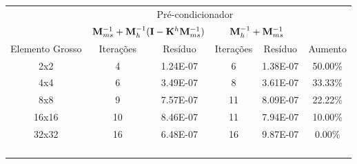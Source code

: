 \begin{table}[]
\begin{tabular}{cccccc}
\cline{2-5}
\multicolumn{1}{c|}{}                 & \multicolumn{4}{c|}{Pré-condicionador}                                                                                          &                              \\ \cline{2-5}
\multicolumn{1}{c|}{}                 & \multicolumn{2}{c|}{$\mathbf{M}^{-1}_{ms} +\mathbf{M}^{-1}_{h}(\mathbf{I}- \mathbf{K}^h \mathbf{M}^{-1}_{ms})$}                             & \multicolumn{2}{c|}{$\mathbf{M}^{-1}_{h} + \mathbf{M}^{-1}_{ms}$}                              &                              \\ \hline
\multicolumn{1}{|c|}{Elemento Grosso} & \multicolumn{1}{c|}{Iterações} & \multicolumn{1}{c|}{Resíduo}  & \multicolumn{1}{c|}{Iterações} & \multicolumn{1}{c|}{Resíduo}  & \multicolumn{1}{c|}{Aumento} \\ \hline
\multicolumn{1}{|c|}{2x2}             & \multicolumn{1}{c|}{4}         & \multicolumn{1}{c|}{1.24E-07} & \multicolumn{1}{c|}{6}         & \multicolumn{1}{c|}{1.38E-07} & \multicolumn{1}{c|}{50.00\%} \\ \hline
\multicolumn{1}{|c|}{4x4}             & \multicolumn{1}{c|}{6}         & \multicolumn{1}{c|}{3.49E-07} & \multicolumn{1}{c|}{8}         & \multicolumn{1}{c|}{3.61E-07} & \multicolumn{1}{c|}{33.33\%} \\ \hline
\multicolumn{1}{|c|}{8x8}             & \multicolumn{1}{c|}{9}         & \multicolumn{1}{c|}{7.57E-07} & \multicolumn{1}{c|}{11}        & \multicolumn{1}{c|}{8.09E-07} & \multicolumn{1}{c|}{22.22\%} \\ \hline
\multicolumn{1}{|c|}{16x16}           & \multicolumn{1}{c|}{10}        & \multicolumn{1}{c|}{8.46E-07} & \multicolumn{1}{c|}{11}        & \multicolumn{1}{c|}{7.94E-07} & \multicolumn{1}{c|}{10.00\%} \\ \hline
\multicolumn{1}{|c|}{32x32}           & \multicolumn{1}{c|}{16}        & \multicolumn{1}{c|}{6.48E-07} & \multicolumn{1}{c|}{16}        & \multicolumn{1}{c|}{9.87E-07} & \multicolumn{1}{c|}{0.00\%}  \\ \hline
\multicolumn{1}{l}{}                  & \multicolumn{1}{l}{}           & \multicolumn{1}{l}{}          & \multicolumn{1}{l}{}           & \multicolumn{1}{l}{}          & \multicolumn{1}{l}{}         \\
\multicolumn{1}{l}{}                  & \multicolumn{1}{l}{}           & \multicolumn{1}{l}{}          & \multicolumn{1}{l}{}           & \multicolumn{1}{l}{}          & \multicolumn{1}{l}{}         \\
\multicolumn{1}{l}{}                  & \multicolumn{1}{l}{}           & \multicolumn{1}{l}{}          & \multicolumn{1}{l}{}           & \multicolumn{1}{l}{}          & \multicolumn{1}{l}{}         \\
\multicolumn{1}{l}{}                  & \multicolumn{1}{l}{}           & \multicolumn{1}{l}{}          & \multicolumn{1}{l}{}           & \multicolumn{1}{l}{}          & \multicolumn{1}{l}{}        
\end{tabular}
\end{table}

